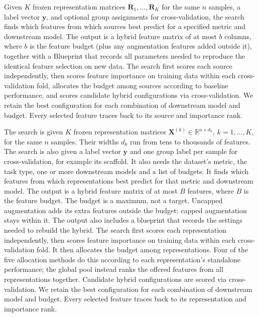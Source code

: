 Given $K$ frozen representation matrices $\mathbf{R}_1, \dots, \mathbf{R}_K$ for the same $n$ samples, a label vector $\mathbf{y}$, and optional group assignments for cross-validation, the search finds which features from which sources best predict for a specified metric and downstream model. The output is a hybrid feature matrix of at most $b$ columns, where $b$ is the feature budget (plus any augmentation features added outside it), together with a Blueprint that records all parameters needed to reproduce the identical feature selection on new data. The search first scores each source independently, then scores feature importance on training data within each cross-validation fold, allocates the budget among sources according to baseline performance, and scores candidate hybrid configurations via cross-validation. We retain the best configuration for each combination of downstream model and budget. Every selected feature traces back to its source and importance rank.

The search is given $K$ frozen representation matrices $\mathbf{X}^{(k)} \in \mathbb{R}^{n\times d_k}$, $k = 1, \dots, K$, for the same $n$ samples. Their widths $d_k$ run from tens to thousands of features. The search is also given a label vector $\mathbf{y}$ and one group label per sample for cross-validation, for example its scaffold. It also needs the dataset's metric, the task type, one or more downstream models and a list of budgets. It finds which features from which representations best predict for that metric and downstream model. The output is a hybrid feature matrix of at most $B$ features, where $B$ is the feature budget. The budget is a maximum, not a target. Uncapped augmentation adds its extra features outside the budget; capped augmentation stays within it. The output also includes a blueprint that records the settings needed to rebuild the hybrid. The search first scores each representation independently, then scores feature importance on training data within each cross-validation fold. It then allocates the budget among representations. Four of the five allocation methods do this according to each representation's standalone performance; the global pool instead ranks the offered features from all representations together. Candidate hybrid configurations are scored via cross-validation. We retain the best configuration for each combination of downstream model and budget. Every selected feature traces back to its representation and importance rank.

